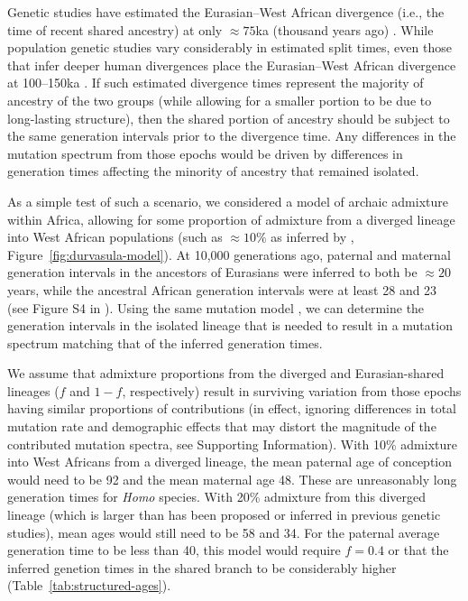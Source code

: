 \documentclass[]{article}
\begin{document}
Genetic studies have estimated the Eurasian--West African divergence (i.e., the
time of recent shared ancestry) at only $\approx 75$ka (thousand years ago)
\citep[e.g.,][]{pagani2015tracing,bergstrom2020insights}. While population
genetic studies vary considerably in estimated split times, even those that
infer deeper human divergences place the Eurasian--West African divergence at
100--150ka \citep[e.g.,][]{schlebusch2017southern}. If such estimated
divergence times represent the majority of ancestry of the two groups (while
allowing for a smaller portion to be due to long-lasting structure), then the
shared portion of ancestry should be subject to the same generation intervals
prior to the divergence time. Any differences in the mutation spectrum from
those epochs would be driven by differences in generation times affecting the
minority of ancestry that remained isolated. 

As a simple test of such a scenario, we considered a model of archaic admixture
within Africa, allowing for some proportion of admixture from a diverged
lineage into West African populations (such as $\approx10\%$ as inferred by
\citet{durvasula2020recovering}, Figure~\ref{fig:durvasula-model}). At 10,000
generations ago, paternal and maternal generation intervals in the ancestors of
Eurasians were inferred to both be $\approx20$ years, while the ancestral
African generation intervals were at least 28 and 23 (see Figure S4 in
\citet{wang2023human}). Using the same mutation model
\citep{jonsson2017parental}, we can determine the generation intervals in the
isolated lineage that is needed to result in a mutation spectrum matching that
of the inferred generation times.

We assume that admixture proportions from the diverged and Eurasian-shared
lineages ($f$ and $1-f$, respectively) result in surviving variation from those
epochs having similar proportions of contributions (in effect, ignoring
    differences in total mutation rate and demographic effects that may distort
the magnitude of the contributed mutation spectra, see Supporting Information).
With 10\% admixture into West Africans from a diverged lineage, the mean
paternal age of conception would need to be 92 and the mean maternal age 48.
These are unreasonably long generation times for \emph{Homo} species. With 20\%
admixture from this diverged lineage (which is larger than has been proposed or
inferred in previous genetic studies), mean ages would still need to be 58 and
34. For the paternal average generation time to be less than 40, this model would
require $f=0.4$ or that the inferred genetion times in the shared branch to be
considerably higher (Table~\ref{tab:structured-ages}).
\end{document}
